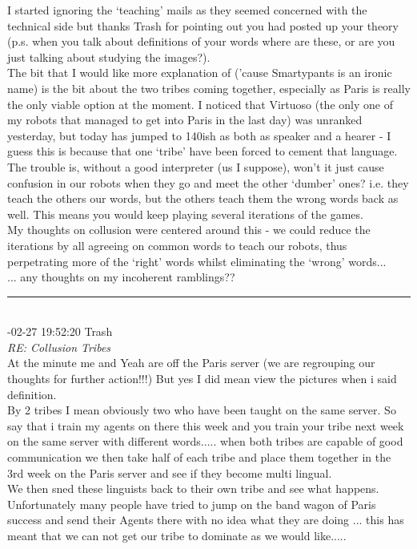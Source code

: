 \begin{mail}
I started ignoring the `teaching' mails as they seemed concerned with the technical side but thanks Trash for pointing out you had posted up your theory (p.s. when you talk about definitions of your words where are these, or are you just talking about studying the images?).\\
The bit that I would like more explanation of ('cause Smartypants is an ironic name) is the bit about the two tribes coming together, especially as Paris is really the only viable option at the moment. I noticed that Virtuoso (the only one of my robots that managed to get into Paris in the last day) was unranked yesterday, but today has jumped to 140ish as both as speaker and a hearer - I guess this is because that one `tribe' have been forced to cement that language.\\
The trouble is, without a good interpreter (us I suppose), won't it just cause confusion in our robots when they go and meet the other `dumber' ones? i.e. they teach the others our words, but the others teach them the wrong words back as well.
This means you would keep playing several iterations of the games.\\
My thoughts on collusion were centered around this - we could reduce the iterations by all agreeing on common words to teach our robots, thus perpetrating more of the `right' words whilst eliminating the `wrong' words...\\
... any thoughts on my incoherent ramblings??\\
\rule{0.8\textwidth}{.4pt}\\
{-02-27 19:52:20	Trash}\\
{\itshape RE: Collusion Tribes}\\
At the minute me and Yeah are off the Paris server (we are regrouping our thoughts for further action!!!)
But yes I did mean view the pictures when i said definition.\\
By 2 tribes I mean obviously two who have been taught on the same server.
So say that i train my agents on there this week and you train your tribe next week on the same server with different words..... when both tribes are capable of good communication we then take half of each tribe and place them together in the 3rd week on the Paris server and see if they become multi lingual.\\
We then sned these linguists back to their own tribe and see what happens.\\
Unfortunately many people have tried to jump on the band wagon of Paris success and send their Agents there with no idea what they are doing ... this has meant that we can not get our tribe to dominate as we would like.....\\

\end{mail}
